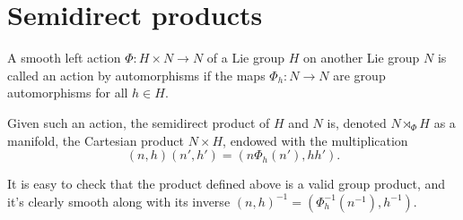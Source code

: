 






\section{Semidirect products}

\begin{defn}
    A smooth left action $\Phi:H\times N\to N$ of a Lie group $H$ on another Lie group $N$ is called an action by automorphisms if the maps $\Phi_h:N\to N$ are group automorphisms for all $h\in H$. 

    Given such an action, the semidirect product of $H$ and $N$ is, denoted $N\rtimes_\Phi H$ as a manifold, the Cartesian product $N\times H$, endowed with the multiplication
    \[(n,h)(n',h')=(n\Phi_h(n'),hh').\]
\end{defn}
It is easy to check that the product defined above is a valid group product, and it's clearly smooth along with its inverse $(n,h)^{-1}=(\Phi_h^{-1}(n^{-1}),h^{-1})$.

